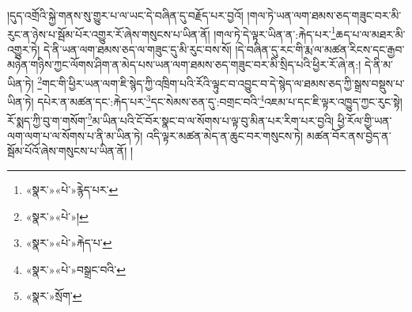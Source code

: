 །དུད་འགྲོའི་སྐྱེ་གནས་སུ་གྱུར་པ་ལ་ཡང་དེ་བཞིན་དུ་བརྗོད་པར་བྱའོ། །གལ་ཏེ་ཡན་ལག་ཐམས་ཅད་གཟུང་བར་མི་རུང་ན་ཉེས་པ་སྦོམ་པོར་འགྱུར་རོ་ཞེས་གསུངས་པ་ཡིན་ནོ། །གལ་ཏེ་དེ་ལྟར་ཡིན་ན་:རྐེད་པར་\footnote{«སྣར་»«པེ་»རྙེད་པར་}ཆད་པ་ལ་མཐར་མི་འགྱུར་ཏེ། དེ་ནི་ཡན་ལག་ཐམས་ཅད་ལ་གཟུང་དུ་མི་རུང་བས་སོ། །དེ་བཞིན་དུ་རང་གི་རྨ་ལ་མཚན་རིངས་དང་རྒྱབ་མཉེན་གཉིས་ཀྱང་ལོགས་ཤིག་ན་མེད་པས་ཡན་ལག་ཐམས་ཅད་གཟུང་བར་མི་སྲིད་པའི་ཕྱིར་རོ་ཞེ་ན:། དེ་ནི་མ་ཡིན་ཏེ། \footnote{«སྣར་»«པེ་»།  }གང་གི་ཕྱིར་ཡན་ལག་ཇི་སྙེད་ཀྱི་འཁྲིག་པའི་རོའི་ལྟུང་བ་འབྱུང་བ་དེ་སྙེད་ལ་ཐམས་ཅད་ཀྱི་སྒྲས་བསྡུས་པ་ཡིན་ཏེ། དཔེར་ན་མཚན་དང་:རྐེད་པར་\footnote{«སྣར་»«པེ་»རྐེད་པ་}དང་སེམས་ཅན་དུ་:བགྲང་བའི་\footnote{«སྣར་»«པེ་»བསྒྲང་བའི་}འཇམ་པ་དང་ཇི་ལྟར་འཁྱུད་ཀྱང་རུང་སྟེ། རོ་སྨད་ཀྱི་བུ་ག་གསོག་\footnote{«སྣར་»སྲོག་}མ་ཡིན་པའི་ངོ་བོར་སྣང་བ་ལ་སོགས་པ་ལྟ་བུ་མིན་པར་རིག་པར་བྱའི། ཕྱི་རོལ་གྱི་ཡན་ལག་ལག་པ་ལ་སོགས་པ་ནི་མ་ཡིན་ཏེ། འདི་ལྟར་མཚན་མེད་ན་ཆུང་བར་གསུངས་ཏེ། མཚན་བོར་ནས་བྱེད་ན་སྦོམ་པོའོ་ཞེས་གསུངས་པ་ཡིན་ནོ། །

